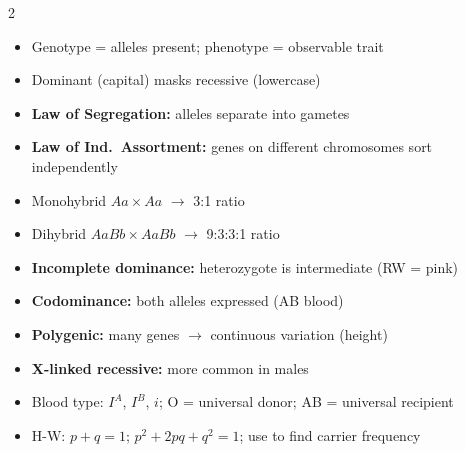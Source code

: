 \documentclass[11pt, letterpaper]{article}
\begin{document}
\begin{tcolorbox}[colback=part3bg, colframe=sectionpurple,
  title={\bfseries Mendelian \& Non-Mendelian Genetics}, arc=3pt, boxrule=1pt]
\footnotesize
\begin{multicols}{2}
\begin{itemize}[noitemsep, leftmargin=*]
  \item Genotype = alleles present; phenotype = observable trait
  \item Dominant (capital) masks recessive (lowercase)
  \item \textbf{Law of Segregation:} alleles separate into gametes
  \item \textbf{Law of Ind.\ Assortment:} genes on different chromosomes sort independently
  \item Monohybrid $Aa \times Aa$ $\to$ 3:1 ratio
  \item Dihybrid $AaBb \times AaBb$ $\to$ 9:3:3:1 ratio
\end{itemize}
\columnbreak
\begin{itemize}[noitemsep, leftmargin=*]
  \item \textbf{Incomplete dominance:} heterozygote is intermediate (RW = pink)
  \item \textbf{Codominance:} both alleles expressed (AB blood)
  \item \textbf{Polygenic:} many genes $\to$ continuous variation (height)
  \item \textbf{X-linked recessive:} more common in males
  \item Blood type: $I^A$, $I^B$, $i$; O = universal donor; AB = universal recipient
  \item H-W: $p+q=1$; $p^2+2pq+q^2=1$; use to find carrier frequency
\end{itemize}
\end{multicols}
\end{tcolorbox}

\vspace{4pt}
\end{document}
